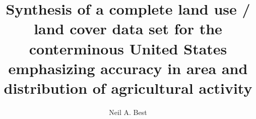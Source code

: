 \documentclass[draftthesis,fullpage]{uiucthesis}
\begin{document}
\title{Synthesis of a complete land use / land cover data set for the conterminous United States emphasizing accuracy in area and distribution of agricultural activity}
\author{Neil A. Best}


\maketitle
\end{document}
